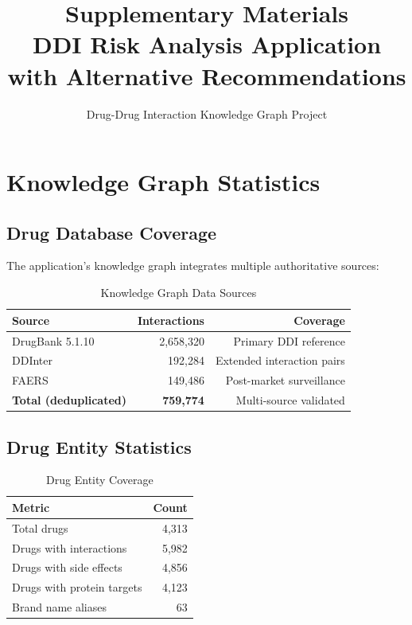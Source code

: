 \documentclass[11pt,a4paper]{article}
\title{\textbf{Supplementary Materials}\\
\large DDI Risk Analysis Application with Alternative Recommendations}
\author{Drug-Drug Interaction Knowledge Graph Project}
\date{}
\begin{document}
\maketitle

\tableofcontents
\newpage

\section{Knowledge Graph Statistics}

\subsection{Drug Database Coverage}

The application's knowledge graph integrates multiple authoritative sources:

\begin{table}[H]
\centering
\caption{Knowledge Graph Data Sources}
\label{tab:sources}
\begin{tabular}{lrr}
\toprule
\textbf{Source} & \textbf{Interactions} & \textbf{Coverage} \\
\midrule
DrugBank 5.1.10 & 2,658,320 & Primary DDI reference \\
DDInter & 192,284 & Extended interaction pairs \\
FAERS & 149,486 & Post-market surveillance \\
\midrule
\textbf{Total (deduplicated)} & \textbf{759,774} & Multi-source validated \\
\bottomrule
\end{tabular}
\end{table}

\subsection{Drug Entity Statistics}

\begin{table}[H]
\centering
\caption{Drug Entity Coverage}
\label{tab:drugs}
\begin{tabular}{lr}
\toprule
\textbf{Metric} & \textbf{Count} \\
\midrule
Total drugs & 4,313 \\
Drugs with interactions & 5,982 \\
Drugs with side effects & 4,856 \\
Drugs with protein targets & 4,123 \\
Brand name aliases & 63 \\
\bottomrule
\end{tabular}
\end{table}
\end{document}
